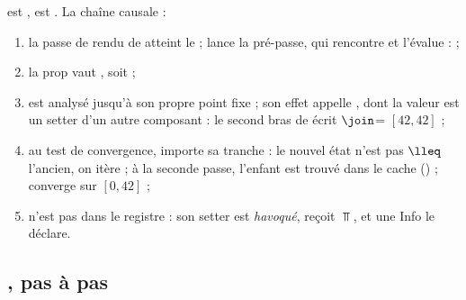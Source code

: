  est ,  est
. La chaîne causale :
\begin{enumerate}
  \item la passe de rendu de  atteint le  ;
     lance la pré-passe, qui rencontre
     et l'évalue :  ;
  \item la prop  vaut , soit
     ;
  \item {} est analysé jusqu'à son propre point fixe ; son effet
    appelle , dont la valeur est un setter d'un autre
    composant : le second bras de  écrit
     $\join$= $[42,42]$ ;
  \item au test de convergence,  importe sa tranche : le nouvel
    état n'est pas $\lleq$ l'ancien, on itère ; à la seconde passe, l'enfant
    est trouvé dans le cache () ;  converge
    sur $[0,42]$ ;
  \item {} n'est pas dans le registre : son setter est
    \emph{havoqué},  reçoit $\Top$, et une Info le déclare.
\end{enumerate}


\subsection{, pas à pas}

